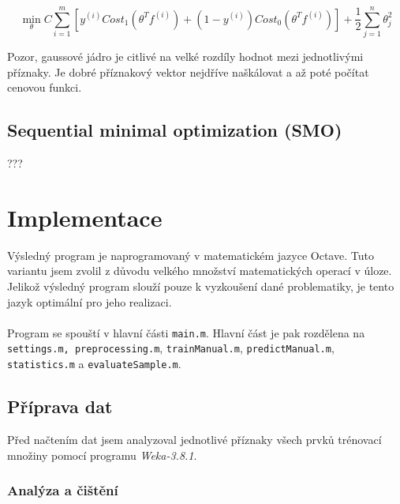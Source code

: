 \documentclass[a4]{article}
\begin{document}
$$\min_{\theta} C \sum_{i=1}^{m}[y^{(i)} Cost_1 (\theta^T f^{(i)})+(1-y^{(i)}) Cost_0 (\theta^T f^{(i)})] + \frac{1}{2} \sum_{j=1}^{n}\theta_{j}^{2}$$

Pozor, gaussové jádro je citlivé na velké rozdíly hodnot mezi jednotlivými příznaky. Je dobré příznakový vektor nejdříve naškálovat a až poté počítat cenovou funkci.

\subsection{Sequential minimal optimization (SMO)}
???

\section{Implementace}
Výsledný program je naprogramovaný v matematickém jazyce Octave. Tuto variantu jsem zvolil z důvodu velkého množství matematických operací v úloze. Jelikož výsledný program slouží pouze k vyzkoušení dané problematiky, je tento jazyk optimální pro jeho realizaci.
\\\\
Program se spouští v hlavní části \texttt{main.m}. Hlavní část je pak rozdělena na \texttt{settings.m, preprocessing.m}, \texttt{trainManual.m}, \texttt{predictManual.m}, \texttt{statistics.m} a \texttt{evaluateSample.m}.

\subsection{Příprava dat}
Před načtením dat jsem analyzoval jednotlivé příznaky všech prvků trénovací množiny pomocí programu \textit{Weka-3.8.1}.

\subsubsection{Analýza a čištění}
\end{document}
